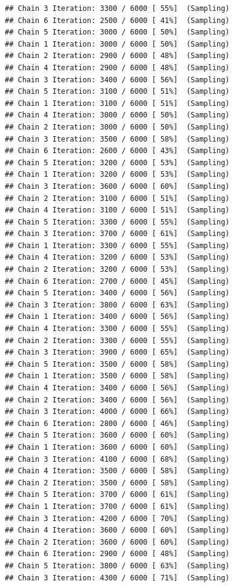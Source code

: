 \documentclass[
]{article}
\begin{document}
\begin{verbatim}
## Chain 3 Iteration: 3300 / 6000 [ 55%]  (Sampling) 
## Chain 6 Iteration: 2500 / 6000 [ 41%]  (Sampling) 
## Chain 5 Iteration: 3000 / 6000 [ 50%]  (Sampling) 
## Chain 1 Iteration: 3000 / 6000 [ 50%]  (Sampling) 
## Chain 2 Iteration: 2900 / 6000 [ 48%]  (Sampling) 
## Chain 4 Iteration: 2900 / 6000 [ 48%]  (Sampling) 
## Chain 3 Iteration: 3400 / 6000 [ 56%]  (Sampling) 
## Chain 5 Iteration: 3100 / 6000 [ 51%]  (Sampling) 
## Chain 1 Iteration: 3100 / 6000 [ 51%]  (Sampling) 
## Chain 4 Iteration: 3000 / 6000 [ 50%]  (Sampling) 
## Chain 2 Iteration: 3000 / 6000 [ 50%]  (Sampling) 
## Chain 3 Iteration: 3500 / 6000 [ 58%]  (Sampling) 
## Chain 6 Iteration: 2600 / 6000 [ 43%]  (Sampling) 
## Chain 5 Iteration: 3200 / 6000 [ 53%]  (Sampling) 
## Chain 1 Iteration: 3200 / 6000 [ 53%]  (Sampling) 
## Chain 3 Iteration: 3600 / 6000 [ 60%]  (Sampling) 
## Chain 2 Iteration: 3100 / 6000 [ 51%]  (Sampling) 
## Chain 4 Iteration: 3100 / 6000 [ 51%]  (Sampling) 
## Chain 5 Iteration: 3300 / 6000 [ 55%]  (Sampling) 
## Chain 3 Iteration: 3700 / 6000 [ 61%]  (Sampling) 
## Chain 1 Iteration: 3300 / 6000 [ 55%]  (Sampling) 
## Chain 4 Iteration: 3200 / 6000 [ 53%]  (Sampling) 
## Chain 2 Iteration: 3200 / 6000 [ 53%]  (Sampling) 
## Chain 6 Iteration: 2700 / 6000 [ 45%]  (Sampling) 
## Chain 5 Iteration: 3400 / 6000 [ 56%]  (Sampling) 
## Chain 3 Iteration: 3800 / 6000 [ 63%]  (Sampling) 
## Chain 1 Iteration: 3400 / 6000 [ 56%]  (Sampling) 
## Chain 4 Iteration: 3300 / 6000 [ 55%]  (Sampling) 
## Chain 2 Iteration: 3300 / 6000 [ 55%]  (Sampling) 
## Chain 3 Iteration: 3900 / 6000 [ 65%]  (Sampling) 
## Chain 5 Iteration: 3500 / 6000 [ 58%]  (Sampling) 
## Chain 1 Iteration: 3500 / 6000 [ 58%]  (Sampling) 
## Chain 4 Iteration: 3400 / 6000 [ 56%]  (Sampling) 
## Chain 2 Iteration: 3400 / 6000 [ 56%]  (Sampling) 
## Chain 3 Iteration: 4000 / 6000 [ 66%]  (Sampling) 
## Chain 6 Iteration: 2800 / 6000 [ 46%]  (Sampling) 
## Chain 5 Iteration: 3600 / 6000 [ 60%]  (Sampling) 
## Chain 1 Iteration: 3600 / 6000 [ 60%]  (Sampling) 
## Chain 3 Iteration: 4100 / 6000 [ 68%]  (Sampling) 
## Chain 4 Iteration: 3500 / 6000 [ 58%]  (Sampling) 
## Chain 2 Iteration: 3500 / 6000 [ 58%]  (Sampling) 
## Chain 5 Iteration: 3700 / 6000 [ 61%]  (Sampling) 
## Chain 1 Iteration: 3700 / 6000 [ 61%]  (Sampling) 
## Chain 3 Iteration: 4200 / 6000 [ 70%]  (Sampling) 
## Chain 4 Iteration: 3600 / 6000 [ 60%]  (Sampling) 
## Chain 2 Iteration: 3600 / 6000 [ 60%]  (Sampling) 
## Chain 6 Iteration: 2900 / 6000 [ 48%]  (Sampling) 
## Chain 5 Iteration: 3800 / 6000 [ 63%]  (Sampling) 
## Chain 3 Iteration: 4300 / 6000 [ 71%]  (Sampling) 

\end{verbatim}
\end{document}
